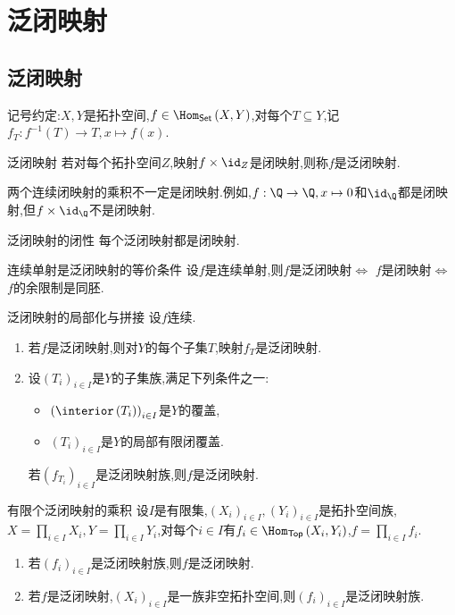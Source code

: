 \chapter{泛闭映射}

\section{泛闭映射}

记号约定:$X,Y$是拓扑空间,$f\in\Hom_{\mathsf{Set}}\left(X,Y\right)$,对每个$T\subseteq Y$,记$f_{T}:f^{-1}\left(T\right)\to T,x\mapsto f\left(x\right)$.

\begin{definition}{泛闭映射}{}
	若对每个拓扑空间$Z$,映射$f\times\id_{Z}$是闭映射,则称$f$是泛闭映射.
\end{definition}

\begin{remark}{}{}
	两个连续闭映射的乘积不一定是闭映射.例如,$f:\Q\to\Q,x\mapsto 0$和$\id_{\Q}$都是闭映射,但$f\times\id_{\Q}$不是闭映射.
\end{remark}

\begin{proposition}{泛闭映射的闭性}{}
	每个泛闭映射都是闭映射.
\end{proposition}

\begin{proposition}{连续单射是泛闭映射的等价条件}{}
	设$f$是连续单射,则$f$是泛闭映射$\iff$ $f$是闭映射$\iff$ $f$的余限制是同胚.
\end{proposition}

\begin{proposition}{泛闭映射的局部化与拼接}{}
	设$f$连续.
	\begin{enumerate}
		\item 若$f$是泛闭映射,则对$Y$的每个子集$T$,映射$f_{T}$是泛闭映射.
		\item 设$\left(T_{i}\right)_{i\in I}$是$Y$的子集族,满足下列条件之一:
		\begin{itemize}
			\item $\left(\interior\left(T_{i}\right)\right)_{i\in I}$是$Y$的覆盖,
			\item $\left(T_{i}\right)_{i\in I}$是$Y$的局部有限闭覆盖.
		\end{itemize}
		若$\left(f_{T_{i}}\right)_{i\in I}$是泛闭映射族,则$f$是泛闭映射.
	\end{enumerate}
\end{proposition}

\begin{proposition}{有限个泛闭映射的乘积}{}
	设$I$是有限集,$\left(X_{i}\right)_{i\in I},\left(Y_{i}\right)_{i\in I}$是拓扑空间族,$X=\prod\limits_{i\in I}X_{i},Y=\prod\limits_{i\in I}Y_{i}$,对每个$i\in I$有$f_{i}\in\Hom_{\mathsf{Top}}\left(X_{i},Y_{i}\right)$,$f=\prod\limits_{i\in I}f_{i}$.
	\begin{enumerate}
		\item 若$\left(f_{i}\right)_{i\in I}$是泛闭映射族,则$f$是泛闭映射.
		\item 若$f$是泛闭映射,$\left(X_{i}\right)_{i\in I}$是一族非空拓扑空间,则$\left(f_{i}\right)_{i\in I}$是泛闭映射族.
	\end{enumerate}
\end{proposition}


